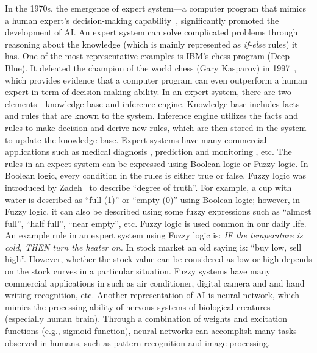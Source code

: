 In the 1970s, the emergence of expert system---a computer program that mimics a human expert's decision-making capability~\cite{Jackson1998}, significantly promoted the development of AI. An expert system can solve complicated problems through reasoning about the knowledge (which is mainly represented as \textit{if-else} rules) it has. One of the most representative examples is IBM's chess program (Deep Blue). It defeated the champion of the world chess (Gary Kasparov) in 1997~\cite{Newborn1992}, which provides evidence that a computer program can even outperform a human expert in term of decision-making ability.  In an expert system, there are two elements---knowledge base and inference engine. Knowledge base includes facts and rules that are known to the system. Inference engine utilizes the facts and rules to make decision and derive new rules, which are then stored in the system to update the knowledge base. Expert systems have many commercial applications such as medical diagnosis \cite{Jonathan1990}, prediction \cite{Robert1993} and monitoring \cite{Salvaneschi1996}, etc. The rules in an expect system can be expressed using Boolean logic or Fuzzy logic. In Boolean logic, every condition in the rules is either true or false. Fuzzy logic was introduced by Zadeh~\cite{Zadeh:IC:1965} to describe ``degree of truth''. For example, a cup with water is described as ``full (1)'' or ``empty (0)'' using Boolean logic; however, in Fuzzy logic, it can also be described using some fuzzy expressions such as ``almost full'', ``half full'', ``near empty'', etc. Fuzzy logic is used common in our daily life. An example rule in an expert system using Fuzzy logic is: \textit{IF the temperature is cold, THEN turn the heater on.} In stock market an old saying is: ``buy low, sell high''. However, whether the stock value can be considered as low or high depends on the stock curves in a particular situation. Fuzzy systems have many commercial applications in such as air conditioner, digital camera and and hand writing recognition, etc. Another representation of AI is neural network, which mimics the processing ability of nervous systems of biological creatures (especially human brain). Through a combination of weights and excitation functions (e.g., sigmoid function), neural networks can accomplish many tasks observed in humans, such as pattern recognition and image processing. 


